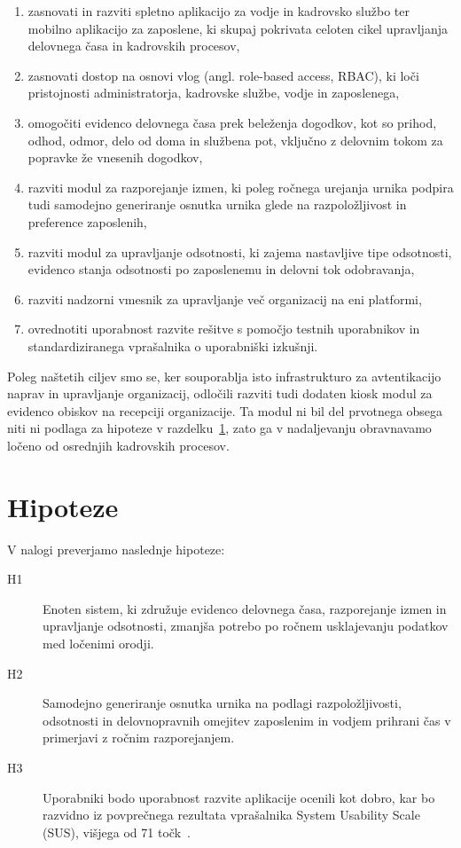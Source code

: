 \begin{enumerate}
    \item zasnovati in razviti spletno aplikacijo za vodje in kadrovsko službo ter mobilno aplikacijo za zaposlene, ki skupaj pokrivata celoten cikel upravljanja delovnega časa in kadrovskih procesov,
    \item zasnovati dostop na osnovi vlog (angl. role-based access, RBAC), ki loči pristojnosti administratorja, kadrovske službe, vodje in zaposlenega,
    \item omogočiti evidenco delovnega časa prek beleženja dogodkov, kot so prihod, odhod, odmor, delo od doma in službena pot, vključno z delovnim tokom za popravke že vnesenih dogodkov,
    \item razviti modul za razporejanje izmen, ki poleg ročnega urejanja urnika podpira tudi samodejno generiranje osnutka urnika glede na razpoložljivost in preference zaposlenih,
    \item razviti modul za upravljanje odsotnosti, ki zajema nastavljive tipe odsotnosti, evidenco stanja odsotnosti po zaposlenemu in delovni tok odobravanja,
    \item razviti nadzorni vmesnik za upravljanje več organizacij na eni platformi,
    \item ovrednotiti uporabnost razvite rešitve s pomočjo testnih uporabnikov in standardiziranega vprašalnika o uporabniški izkušnji.
\end{enumerate}

Poleg naštetih ciljev smo se, ker souporablja isto infrastrukturo za avtentikacijo naprav in upravljanje organizacij, odločili razviti tudi dodaten kiosk modul za evidenco obiskov na recepciji organizacije. Ta modul ni bil del prvotnega obsega niti ni podlaga za hipoteze v razdelku~\ref{sec:hipoteze}, zato ga v nadaljevanju obravnavamo ločeno od osrednjih kadrovskih procesov.

\section{Hipoteze}
\label{sec:hipoteze}

V nalogi preverjamo naslednje hipoteze:

\begin{description}
    \item[H1] Enoten sistem, ki združuje evidenco delovnega časa, razporejanje izmen in upravljanje odsotnosti, zmanjša potrebo po ročnem usklajevanju podatkov med ločenimi orodji.
    \item[H2] Samodejno generiranje osnutka urnika na podlagi razpoložljivosti, odsotnosti in delovnopravnih omejitev zaposlenim in vodjem prihrani čas v primerjavi z ročnim razporejanjem.
    \item[H3] Uporabniki bodo uporabnost razvite aplikacije ocenili kot dobro, kar bo razvidno iz povprečnega rezultata vprašalnika System Usability Scale (SUS), višjega od 71 točk~\cite{bangor2009determining,hertzum2026meta}.
\end{description}

